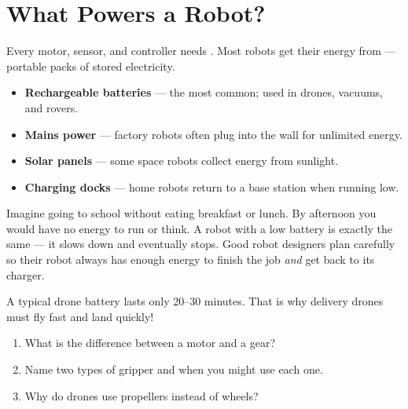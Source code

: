 \section*{What Powers a Robot?}

Every motor, sensor, and controller needs . Most robots get
their energy from  --- portable packs of stored electricity.

\begin{itemize}
  \item \textbf{Rechargeable batteries} --- the most common; used in drones, vacuums, and rovers.
  \item \textbf{Mains power} --- factory robots often plug into the wall for unlimited energy.
  \item \textbf{Solar panels} --- some space robots collect energy from sunlight.
  \item \textbf{Charging docks} --- home robots return to a base station when running low.
\end{itemize}

\begin{picturethis}
  Imagine going to school without eating breakfast or lunch.
  By afternoon you would have no energy to run or think.
  A robot with a low battery is exactly the same --- it slows down
  and eventually stops. Good robot designers plan carefully
  so their robot always has enough energy to finish the job
  \emph{and} get back to its charger.
\end{picturethis}

\begin{funfact}
  A typical drone battery lasts only 20--30 minutes.
  That is why delivery drones must fly fast and land quickly!
\end{funfact}

\sectionrule

\begin{quickcheck}
  \begin{enumerate}
    \item What is the difference between a motor and a gear?
    \item Name two types of gripper and when you might use each one.
    \item Why do drones use propellers instead of wheels?
  \end{enumerate}
\end{quickcheck}

